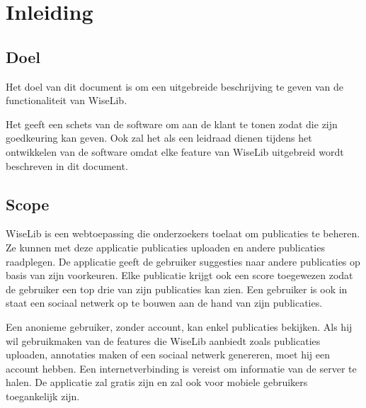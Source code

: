 \section{Inleiding}

\subsection{Doel}

Het doel van dit document is om een uitgebreide beschrijving te geven van de functionaliteit van WiseLib. 

Het geeft een schets van de software om aan de klant te tonen zodat die zijn goedkeuring kan geven. Ook zal het als een leidraad dienen tijdens het ontwikkelen van de software omdat elke feature van WiseLib uitgebreid wordt beschreven in dit document.

\subsection{Scope}

WiseLib is een webtoepassing die onderzoekers toelaat om publicaties te beheren. Ze kunnen met deze applicatie publicaties uploaden en andere publicaties raadplegen. De applicatie geeft de gebruiker suggesties naar andere publicaties op basis van zijn voorkeuren. Elke publicatie krijgt ook een score toegewezen zodat de gebruiker een top drie van zijn publicaties kan zien. Een gebruiker is ook in staat een sociaal netwerk op te bouwen aan de hand van zijn publicaties. \newline

Een anonieme gebruiker, zonder account, kan enkel publicaties bekijken. Als hij wil gebruikmaken van de features die WiseLib aanbiedt zoals publicaties uploaden, annotaties maken of een sociaal netwerk genereren, moet hij een account hebben. Een internetverbinding is vereist om informatie van de server te halen. De applicatie zal gratis zijn en zal ook voor mobiele gebruikers toegankelijk zijn. 


